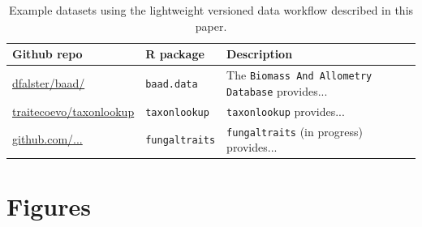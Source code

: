 \documentclass[a4paper,11pt]{article}
\newcommand{\ghsmurl}[1]{{\footnotesize\href{https://github.com/#1}{#1}}}
\begin{document}
\newpage

\begin{table}[h!]
\centering
\caption{Example datasets using the lightweight versioned data workflow described in this paper.}
{\footnotesize
\vspace{1cm}

  \begin{tabular}{p{3.5cm}p{3cm}p{7cm}}
  \hline
   \textbf{Github repo} & \textbf{R package} & \textbf{Description} \\ \hline
  \ghsmurl{dfalster/baad/} & \texttt{baad.data} & The \texttt{Biomass And Allometry Database} \citep{Falster-2015} provides...\\
  \ghsmurl{traitecoevo/taxonlookup} & \texttt{taxonlookup} & \texttt{taxonlookup} \citep{Pennell-2015a} provides...\\
  \ghsmurl{github.com/...} & \texttt{fungaltraits} & \texttt{fungaltraits} (in progress) provides... \\
  \hline
  \end{tabular}
  }
\label{tab:examples}
\end{table}

\newpage
\section{Figures}
\end{document}

